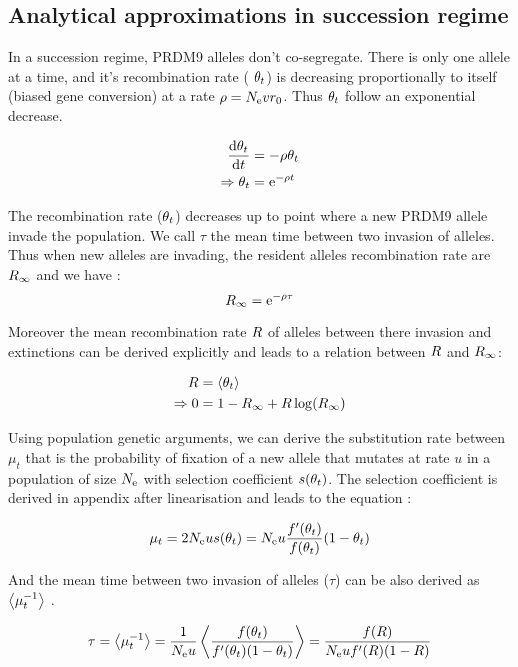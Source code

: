 \documentclass{article}
\begin{document}
\subsection*{Analytical approximations in succession regime} 

In a succession regime, PRDM9 alleles don't co-segregate. There is only one allele at a time, and it's recombination rate ( $\theta_{t}$) is decreasing proportionally to itself (biased gene conversion) at a rate $\rho = N_\mathrm{e} v r_0$. Thus $\theta_{t}$ follow an exponential decrease.

\begin{align} 
   \dfrac{\mathrm{d} \theta_{t}}{\mathrm{d} t}  &=  - \rho \theta_{t} \\
        \Rightarrow \theta_{t} &= \operatorname{e}^{-\rho t}
\end{align}

The recombination rate  ($\theta_{t}$) decreases up to point where a new PRDM9 allele invade the population. We call $\tau$ the mean time between two invasion of alleles. Thus when new alleles are invading, the resident alleles recombination rate are ${R_{\infty}}$ and we have :
\begin{equation}
   {R_{\infty}} =  \operatorname{e}^{-\rho \tau}
\end{equation}

Moreover the mean recombination rate $R$ of alleles between there invasion and extinctions can be derived explicitly and leads to a relation between $R$ and ${R_{\infty}}$: 

\begin{align} 
	R &= \left< \theta_{t} \right> \\
	\Rightarrow 0 &=  1-{R_{\infty}}  + R  \operatorname{log}({R_{\infty}} ) 
\end{align}

Using population genetic arguments, we can derive the substitution rate between $\mu_{t}$ that is the probability of fixation of a new allele that mutates at rate $u$ in a population of size $N_\mathrm{e}$ with selection coefficient $ s(\theta_{t}) $. The selection coefficient is derived in appendix after linearisation and leads to the equation : 

\begin{equation}
\mu_{t} = 2 N_\mathrm{e} u s(\theta_{t}) = N_\mathrm{e} u \dfrac{f'(\theta_{t})}{f(\theta_{t} )} (1 - \theta_{t} ) 
\end{equation}

And the mean time between two invasion of alleles ($\tau$) can be also derived as $\left< \mu_{t}^{-1} \right>$  .

\begin{equation}
\tau = \left< \mu_{t}^{-1} \right> = \dfrac{1}{ N_\mathrm{e} u}\left< \dfrac{f(\theta_{t} )}{f'(\theta_{t})(1 - \theta_{t} )} \right>  = \dfrac{f(R )}{ N_\mathrm{e} u f'(R)(1 - R) }
\end{equation}
\end{document}
